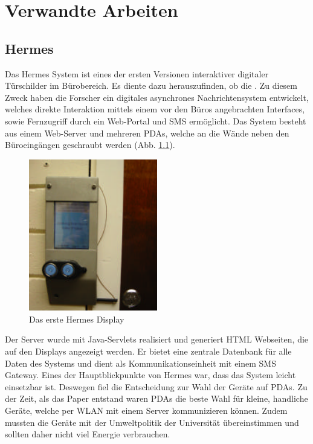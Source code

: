 \chapter{Verwandte Arbeiten}
\section{Hermes}
Das Hermes System\cite{cheverest:2003:paper}\cite{cheverest:2003:article}\cite{cheveres:2005:hermes-bluetooth} ist eines der ersten Versionen interaktiver digitaler Türschilder im Bürobereich.
Es diente dazu herauszufinden, ob die \cite{cheverest:2003:paper}\cite{cheverest:2003:article}.
Zu diesem Zweck haben die Forscher ein digitales asynchrones Nachrichtensystem entwickelt, welches direkte Interaktion mittels einem vor den Büros angebrachten Interfaces, sowie Fernzugriff durch ein Web-Portal und SMS ermöglicht.
Das System besteht aus einem Web-Server und mehreren PDAs, welche an die Wände neben den Büroeingängen geschraubt werden (Abb. \ref{img:hermesDisplay}).
\begin{figure}[h!]
  \centering
    \includegraphics[width=0.5\textwidth]{./img/hermes_display.png}
  \caption{Das erste Hermes Display\cite{cheverest:2003:paper}}
  \label{img:hermesDisplay} %
\end{figure}
Der Server wurde mit Java-Servlets realisiert und generiert HTML Webseiten, die auf den Displays angezeigt werden. Er bietet eine zentrale Datenbank für alle Daten des Systems und dient als Kommunikationseinheit mit einem SMS Gateway.
Eines der Hauptblickpunkte von Hermes war, dass das System leicht einsetzbar ist. Deswegen fiel die Entscheidung zur Wahl der Geräte auf PDAs. Zu der Zeit, als das Paper entstand waren PDAs die beste Wahl für kleine, handliche Geräte, welche per WLAN mit einem Server kommunizieren können. Zudem mussten die Geräte mit der Umweltpolitik der Universität übereinstimmen und sollten daher nicht viel Energie verbrauchen.
